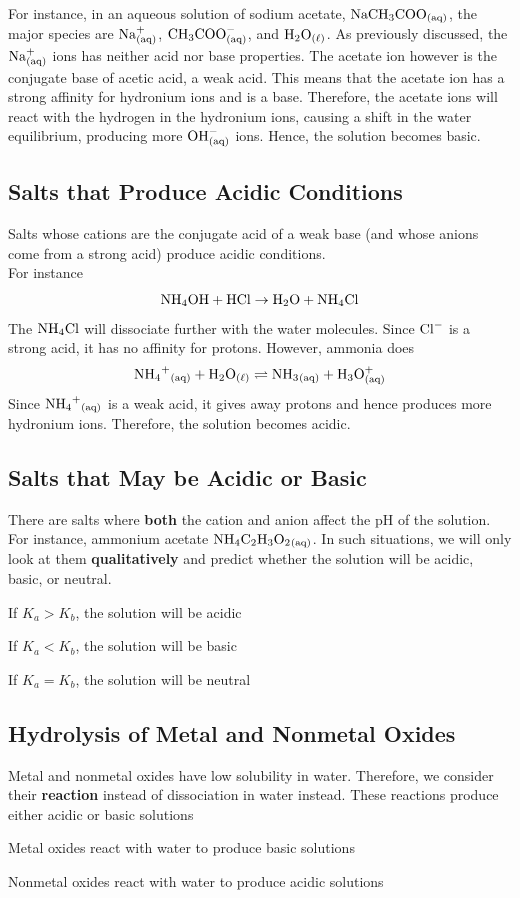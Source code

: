 For instance, in an aqueous solution of sodium acetate, $\ch{NaCH3COO_{(aq)}}$, the major
species are $\ch{Na^+_{(aq)}}$, $\ch{CH3COO^-_{(aq)}}$, and $\ch{H2O_{(\ell)}}$. As previously
discussed, the $\ch{Na^+_{(aq)}}$ ions has neither acid nor base properties. The acetate ion
however is the conjugate base of acetic acid, a weak acid. This means that the acetate ion has a 
strong affinity for hydronium ions and is a base. Therefore, the acetate ions will react with
the hydrogen in the hydronium ions, causing a shift in the water equilibrium, producing more 
$\ch{OH^-_{(aq)}}$ ions. Hence, the solution becomes basic.

\subsection{Salts that Produce Acidic Conditions}
Salts whose cations are the conjugate acid of a weak base (and whose anions come from a strong
acid) produce acidic conditions.\\

For instance
\[
    \ch{NH4OH}+\ch{HCl}\to \ch{H2O}+\ch{NH4Cl}
\]
The $\ch{NH4Cl}$ will dissociate further with the water molecules. Since $\ch{Cl^-}$ is a strong
acid, it has no affinity for protons. However, ammonia does
\[
    \ch{NH4^+_{(aq)}}+\ch{H2O_{(\ell)}}\rightleftharpoons \ch{NH3_{(aq)}}+\ch{H3O^+_{(aq)}}
\]
Since $\ch{NH4^+_{(aq)}}$ is a weak acid, it gives away protons and hence produces more hydronium
ions. Therefore, the solution becomes acidic.

\subsection{Salts that May be Acidic or Basic}
There are salts where \textbf{both} the cation and anion affect the pH of the solution. For instance,
ammonium acetate $\ch{NH4C2H3O2_{(aq)}}$. In such situations, we will only look at them 
\textbf{qualitatively} and predict whether the solution will be acidic, basic, or neutral.
\begin{bulleted-list}
    \item If $K_a>K_b$, the solution will be acidic
    \item If $K_a<K_b$, the solution will be basic
    \item If $K_a=K_b$, the solution will be neutral
\end{bulleted-list}

\subsection{Hydrolysis of Metal and Nonmetal Oxides}
Metal and nonmetal oxides have low solubility in water. Therefore, we consider their \textbf{reaction}
instead of dissociation in water instead. These reactions produce either acidic or basic solutions
\begin{bulleted-list}
    \item Metal oxides react with water to produce basic solutions
    \item Nonmetal oxides react with water to produce acidic solutions
\end{bulleted-list}

